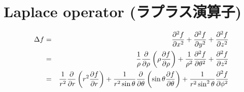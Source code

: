 %
%
%
%
%
\section{Laplace operator (ラプラス演算子)}

\begin{eqnarray*}
\Delta f  & = & \frac{\partial^2 f}{\partial x^2} + \frac{\partial^2 f}{\partial y^2} + \frac{\partial^2 f}{\partial z^2} \\
      & = & {1 \over \rho} {\partial \over \partial \rho} \left( \rho {\partial f \over \partial \rho} \right) + {1 \over \rho^2} {\partial^2 f \over \partial \theta^2} + {\partial^2 f \over \partial z^2 } \\
      & = & {1 \over r^2} {\partial \over \partial r} \left( r^2 {\partial f \over \partial r} \right) + {1 \over r^2 \sin \theta} {\partial \over \partial \theta} \left( \sin \theta {\partial f \over \partial \theta} \right) + {1 \over r^2 \sin^2 \theta} {\partial^2 f \over \partial \phi^2}
\end{eqnarray*}
